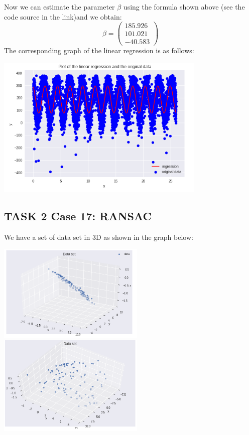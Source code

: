 \documentclass[12pt,a4paper]{report}
\begin{document}
Now we can estimate the parameter $\beta$ using the formula shown above (see the code source in the link)and we obtain: 
$$\beta = \left(\begin{array}{ccc} 185.926 \\ 101.021  \\ -40.583 \end{array}\right)$$
The corresponding graph of the linear regression is as follows: 	
\begin{center}
\includegraphics[width=10cm]{Capture3.png}
\end{center}

\subsection*{TASK 2 Case 17: RANSAC}
We have a set of data set in 3D as shown in the graph below: 
\begin{center}
\includegraphics[width=7cm]{Capture4.png}
\includegraphics[width=7cm]{Capture5.png}
\end{center}
\end{document}
